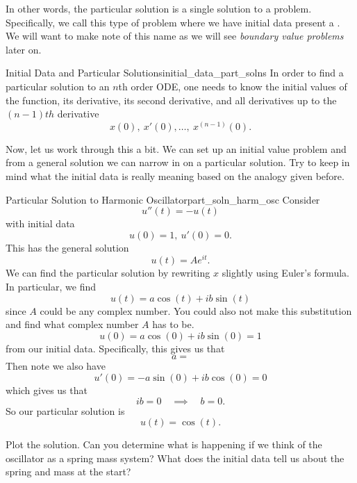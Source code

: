         \noindent In other words, the particular solution is a single solution to a problem.  Specifically, we call this type of problem where we have initial data present a  .  We will want to make note of this name as we will see \emph{boundary value problems} later on. 
        
        \begin{prop}{Initial Data and Particular Solutions}{initial_data_part_solns}
        In order to find a particular solution to an $n$th order ODE, one needs to know the initial values of the function, its derivative, its second derivative, and all derivatives up to the $(n-1)th$ derivative
        \[
        x(0),~ x'(0),\dots,~ x^{(n-1)}(0).
        \]
        \end{prop}
        
        \noindent Now, let us work through this a bit.  We can set up an initial value problem and from a general solution we can narrow in on a particular solution.  Try to keep in mind what the initial data is really meaning based on the analogy given before.
        
        
        \begin{ex}{Particular Solution to Harmonic Oscillator}{part_soln_harm_osc}
        Consider 
        \[
        u''(t)=-u(t)
        \]
        with initial data
        \[
        u(0)=1, ~ u'(0)=0.
        \]
        This has the general solution
        \[
        u(t)=Ae^{it}.
        \]
        We can find the particular solution by rewriting $x$ slightly using Euler's formula. In particular, we find
        \[
        u(t)=a\cos(t)+ib\sin(t)
        \]
        since $A$ could be any complex number.  You could also not make this substitution and find what complex number $A$ has to be.
        \[
        u(0)=a\cos(0)+ib\sin(0)=1
        \]
        from our initial data.  Specifically, this gives us that
        \[
        a=
        \]
        Then note we also have
        \[
        u'(0)=-a\sin (0) +i b\cos (0)=0
        \]
        which gives us that
        \[
        ib=0 \quad \implies \quad b=0.
        \]
        So our particular solution is
        \[
        u(t)=\cos (t).
        \]
        \end{ex}
        
        \begin{exercise}
        Plot the solution. Can you determine what is happening if we think of the oscillator as a spring mass system? What does the initial data tell us about the spring and mass at the start?
        \end{exercise}
        
